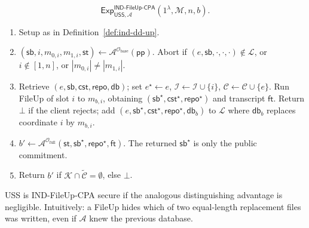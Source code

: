 \begin{definition}
\label{def:ind-fileup-cpa}
\par{}
\[
\mathsf{Exp}^{\mathsf{IND\text{-}FileUp\text{-}CPA}}_{\mathsf{USS},\mathcal{A}}(1^\lambda,\mathcal{M},n,b).
\]
\begin{enumerate}
  \item Setup as in Definition~\ref{def:ind-dd-up}.
  \item $(\mathsf{sb},i,m_{0,i},m_{1,i},\mathsf{st})\gets\mathcal{A}^{\mathcal O_{\mathrm{base}}}(\mathsf{pp})$.
        Abort if $(e,\mathsf{sb},\cdot,\cdot,\cdot)\notin\mathcal{L}$, or $i\notin[1,n]$, or $|m_{0,i}|\neq|m_{1,i}|$.
  \item Retrieve $(e,\mathsf{sb},\mathsf{cst},\mathsf{repo},\mathsf{db})$; set $e^\star\leftarrow e$, $\mathcal{I}\leftarrow\mathcal{I}\cup\{i\}$, $\mathcal{C}\leftarrow\mathcal{C}\cup\{e\}$.
        Run FileUp of slot $i$ to $m_{b,i}$, obtaining $(\mathsf{sb}^\star,\mathsf{cst}^\star,\mathsf{repo}^\star)$ and transcript $\mathsf{ft}$. Return $\bot$ if the client rejects;
        add $(e,\mathsf{sb}^\star,\mathsf{cst}^\star,\mathsf{repo}^\star,\mathsf{db}_b)$ to $\mathcal{L}$ where $\mathsf{db}_b$ replaces coordinate $i$ by $m_{b,i}$.
  \item $b'\gets\mathcal{A}^{\mathcal O_{\mathrm{full}}}(\mathsf{st},\mathsf{sb}^\star,\mathsf{repo}^\star,\mathsf{ft})$. The returned $\mathsf{sb}^\star$ is only the public commitment.
  \item Return $b'$ if $\mathcal{K}\cap\tilde{\mathcal{C}}=\emptyset$, else $\bot$.
\end{enumerate}
USS is IND-FileUp-CPA secure if the analogous distinguishing advantage is negligible.
Intuitively: a FileUp hides which of two equal-length replacement files was written, even if $\mathcal{A}$ knew the previous database.
\end{definition}

